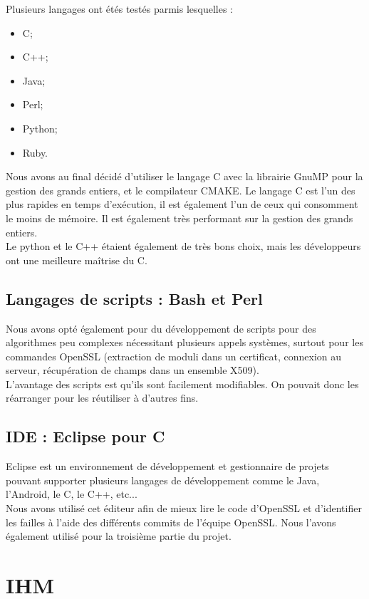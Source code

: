 Plusieurs langages ont étés testés parmis lesquelles :
\begin{itemize}
\item C;
\item C++;
\item Java;
\item Perl;
\item Python;
\item Ruby.\\
\end{itemize}

Nous avons au final décidé d'utiliser le langage C avec la librairie GnuMP \cite{gmplib} pour la gestion des grands entiers, et le compilateur CMAKE.
Le langage C est l'un des plus rapides en temps d'exécution, il est également l'un de ceux qui consomment le moins de mémoire. Il est également très performant sur la gestion des grands entiers.\\
Le python et le C++ étaient également de très bons choix, mais les développeurs ont une meilleure maîtrise du C.

\subsection{Langages de scripts : Bash et Perl}

Nous avons opté également pour du développement de scripts pour des algorithmes peu complexes nécessitant plusieurs appels systèmes, surtout pour les commandes OpenSSL (extraction de moduli dans un certificat, connexion au serveur, récupération de champs dans un ensemble X509).\\
L'avantage des scripts est qu'ils sont facilement modifiables. On pouvait donc les réarranger pour les réutiliser à d'autres fins.

\subsection{IDE : Eclipse pour C}

Eclipse est un environnement de développement et gestionnaire de projets pouvant supporter plusieurs langages de développement comme le Java, l'Android, le C, le C++, etc...\\
Nous avons utilisé cet éditeur afin de mieux lire le code d'OpenSSL et d'identifier les failles à l'aide des différents commits de l'équipe OpenSSL. Nous l'avons également utilisé pour la troisième partie du projet.

\section{IHM}

